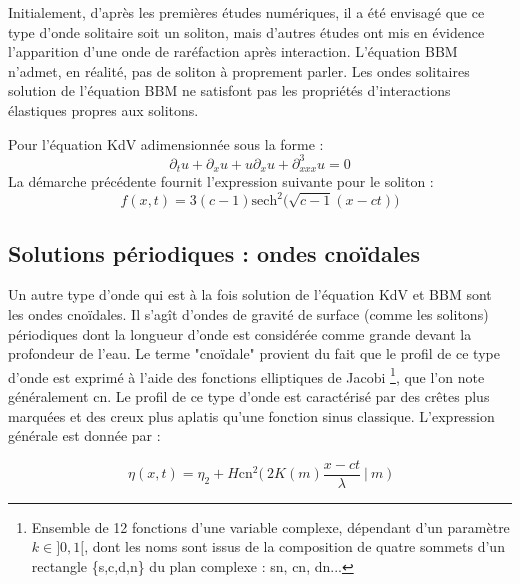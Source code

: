 

Initialement, d'après les premières études numériques, il a été envisagé que ce type d'onde solitaire soit un soliton, mais d'autres études ont mis en évidence l'apparition d'une onde de raréfaction après interaction.\cite{conservation}
L'équation BBM n'admet, en réalité, pas de soliton à proprement parler. Les ondes solitaires solution de l'équation BBM ne satisfont pas les propriétés d'interactions élastiques propres aux solitons.

\begin{remarkbox}
\begin{remark}
    Pour l'équation KdV adimensionnée sous la forme :
    $$\partial_t u + \partial_x u + u\partial_x u + \partial_{xxx}^3 u =0$$
    La démarche précédente fournit l'expression suivante pour le soliton :
    $$ f(x,t) = 3 (c - 1) \text{sech}^2\Big(\sqrt{c - 1}(x - ct)\Big) $$
\end{remark}
\end{remarkbox}

\subsection{Solutions périodiques : ondes cnoïdales}

Un autre type d'onde qui est à la fois solution de l'équation KdV et BBM sont les ondes cnoïdales. Il s'agît d'ondes de gravité de surface (comme les solitons) périodiques dont la longueur d'onde est considérée comme grande devant la profondeur de l'eau. Le terme "cnoïdale" provient du fait que le profil de ce type d'onde est exprimé à l'aide des fonctions elliptiques de Jacobi \footnote{Ensemble de 12 fonctions d'une variable complexe, dépendant d'un paramètre $k\in ]0,1[$, dont les noms sont issus de la composition de quatre sommets d'un rectangle \{s,c,d,n\} du plan complexe : sn, cn, dn...}, que l'on note généralement cn. 
Le profil de ce type d'onde est caractérisé par des crêtes plus marquées et des creux plus aplatis qu'une fonction sinus classique. L'expression générale est donnée par :

$$\eta(x,t) = \eta_2 + H \text{cn}^2\Bigg( \ 2K(m)\frac{x - ct}{\lambda} \ \Bigg| \ m \ \Bigg)$$

